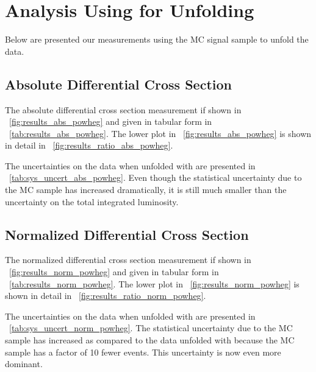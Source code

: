 \chapter{Analysis Using \texorpdfstring{\POWHEG}{POWHEG} for Unfolding}
\label{app:powheg_analysis}

Below are presented our measurements using the \POWHEG MC signal sample to
unfold the data.

\section{Absolute Differential Cross Section}
\label{sec:results_abs_powheg}

The absolute differential cross section measurement if shown
in \FIG~\ref{fig:results_abs_powheg} and given in tabular form in
\TAB~\ref{tab:results_abs_powheg}. The lower plot in
\FIG~\ref{fig:results_abs_powheg} is shown in detail in
\FIG~\ref{fig:results_ratio_abs_powheg}.

The uncertainties on the data when unfolded with \POWHEG are presented in
\TAB~\ref{tab:sys_uncert_abs_powheg}. Even though the statistical uncertainty
due to the MC sample has increased dramatically, it is still much smaller than
the uncertainty on the total integrated luminosity.

\section{Normalized Differential Cross Section}
\label{sec:results_norm_powheg}

The normalized differential cross section measurement if shown in
\FIG~\ref{fig:results_norm_powheg} and given in tabular form in
\TAB~\ref{tab:results_norm_powheg}. The lower plot in
\FIG~\ref{fig:results_norm_powheg} is shown in detail in
\FIG~\ref{fig:results_ratio_norm_powheg}.

The uncertainties on the data when unfolded with \POWHEG are presented in
\TAB~\ref{tab:sys_uncert_norm_powheg}. The statistical uncertainty due to the
MC sample has increased as compared to the data unfolded with \MADGRAPH because
the \POWHEG MC sample has a factor of 10 fewer events. This uncertainty is now
even more dominant.








